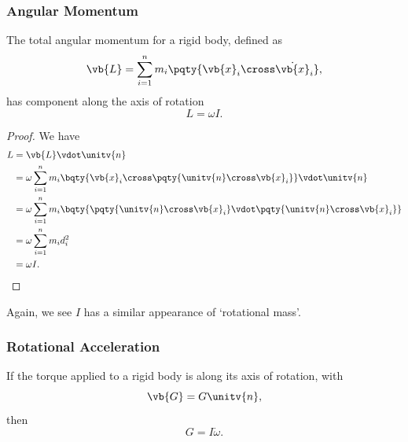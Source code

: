 \subsubsection{Angular Momentum}

\begin{proposition}
    \label{prop:angular-momentum-rigid-body}%
    The total angular momentum for a rigid body, defined as
    \begin{equation}
        \vb{L} = \sum_{i = 1}^{n} m_i \pqty{\vb{x}_i \cross \dot{\vb{x}}_i},
    \end{equation}
    has component along the axis of rotation
    \begin{equation}
        \boxed{L = \omega I.}
    \end{equation}
\end{proposition}

\begin{proof}
    We have
    \begin{subequations}\begin{align}
        L &= \vb{L} \vdot \unitv{n} \\
        &= \omega \sum_{i = 1}^{n} m_i \bqty{\vb{x}_i \cross \pqty{\unitv{n} \cross \vb{x}_i}} \vdot \unitv{n} \\
        &= \omega \sum_{i = 1}^{n} m_i \bqty{\pqty{\unitv{n} \cross \vb{x}_i} \vdot \pqty{\unitv{n} \cross \vb{x}_i}} \\
        &= \omega \sum_{i = 1}^{n} m_i d_i^2 \\
        &= \omega I.
    \end{align}\end{subequations}
\end{proof}

Again, we see \(I\) has a similar appearance of `rotational mass'.

\subsubsection{Rotational Acceleration}

\begin{proposition}
    \label{prop:torque-rotational-acceleration}%
    If the torque applied to a rigid body is along its axis of rotation, with 
    \begin{equation}
        \vb{G} = G \unitv{n},
    \end{equation}
    then
    \begin{equation}
        \boxed{G = I \dot{\omega}.}
    \end{equation}
\end{proposition}

